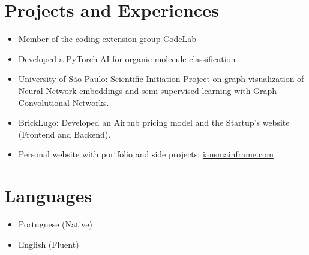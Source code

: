 \documentclass[a4paper,12pt]{article}
\begin{document}
\section*{Projects and Experiences}
\vspace{-0.5em}
\begin{itemize}[leftmargin=*, itemsep=-1.5pt]
  \item Member of the coding extension group CodeLab
  \item Developed a PyTorch AI for organic molecule classification
  \item University of São Paulo: Scientific Initiation Project on graph visualization of Neural Network embeddings and semi-supervised learning with Graph Convolutional Networks.
  \item BrickLugo: Developed an Airbnb pricing model and the Startup's website (Frontend and Backend).
  \item Personal website with portfolio and side projects: \href{https://iansmainframe.com}{iansmainframe.com}
\end{itemize}
\vspace{-0.5em}

\section*{Languages}
\vspace{-0.5em}
\begin{itemize}[leftmargin=*, itemsep=-1.5pt]
  \item Portuguese (Native)
  \item English (Fluent)
\end{itemize}
\end{document}
